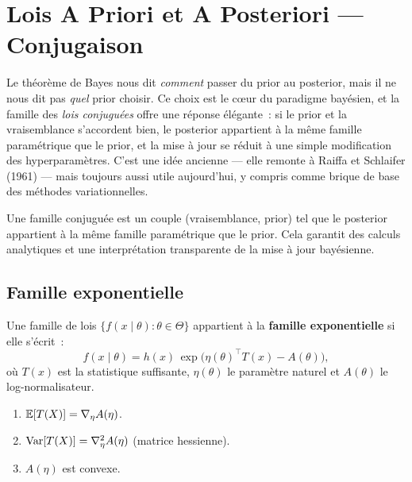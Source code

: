 \chapter{Lois A Priori et A Posteriori --- Conjugaison}
\label{ch:conjugaison}

Le th\'eor\`eme de Bayes nous dit \emph{comment} passer du prior au
posterior, mais il ne nous dit pas \emph{quel} prior choisir. Ce choix est
le c\oe ur du paradigme bay\'esien, et la famille des \emph{lois
conjugu\'ees} offre une r\'eponse \'el\'egante~: si le prior et la
vraisemblance \og s'accordent\fg{} bien, le posterior appartient \`a la m\^eme
famille param\'etrique que le prior, et la mise \`a jour se r\'eduit \`a une
simple modification des hyperparam\`etres. C'est une id\'ee ancienne --- elle
remonte \`a Raiffa et Schlaifer (1961) --- mais toujours aussi utile
aujourd'hui, y compris comme brique de base des m\'ethodes variationnelles.

\begin{intuition}[title=\textbf{Id\'ee centrale}]
Une famille conjugu\'ee est un couple (vraisemblance, prior) tel que le
posterior appartient \`a la m\^eme famille param\'etrique que le prior.
Cela garantit des calculs analytiques et une interpr\'etation
transparente de la mise \`a jour bay\'esienne.
\end{intuition}

\section{Famille exponentielle}

\begin{definition}
Une famille de lois $\{f(x \mid \theta) : \theta \in \Theta\}$
appartient \`a la \textbf{famille exponentielle} si elle s'\'ecrit~:
\[
  f(x \mid \theta) = h(x)\,\exp\!\big(\eta(\theta)^\top T(x) - A(\theta)\big),
\]
o\`u $T(x)$ est la statistique suffisante, $\eta(\theta)$ le param\`etre
naturel et $A(\theta)$ le log-normalisateur.
\end{definition}

\begin{proposition}
\begin{enumerate}
  \item $\mathbb{E}[T(X)] = \nabla_\eta A(\eta)$.
  \item $\mathrm{Var}[T(X)] = \nabla^2_\eta A(\eta)$ (matrice hessienne).
  \item $A(\eta)$ est convexe.
\end{enumerate}
\end{proposition}

